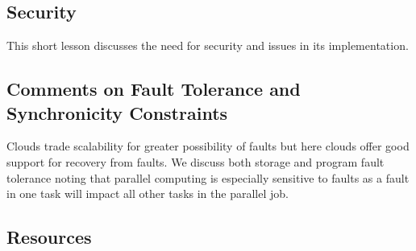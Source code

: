 
\subsection{Security}\label{security}

This short lesson discusses the need for security and issues in its
implementation.



\subsection{Comments on Fault Tolerance and Synchronicity Constraints}\label{comments-on-fault-tolerance-and-synchronicity-constraints}

Clouds trade scalability for greater possibility of faults but here
clouds offer good support for recovery from faults. We discuss both
storage and program fault tolerance noting that parallel computing is
especially sensitive to faults as a fault in one task will impact all
other tasks in the parallel job.


\subsection{Resources}\label{resources-3}

